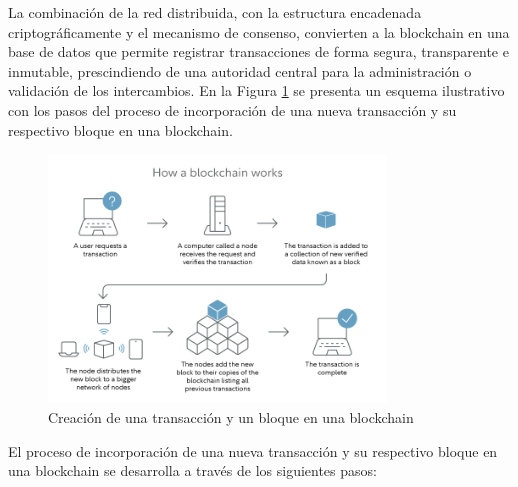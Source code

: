 La combinación de la red distribuida, con la estructura encadenada criptográficamente y el mecanismo de consenso, convierten a la blockchain en una base de datos que permite registrar transacciones de forma segura, transparente e inmutable, prescindiendo de una autoridad central para la administración o validación de los intercambios. En la Figura \ref{fig:blockchain-working} se presenta un esquema ilustrativo con los pasos del proceso de incorporación de una nueva transacción y su respectivo bloque en una blockchain. 

\begin{figure}[!htpb]
    \centering
    \includegraphics[width=0.8\textwidth]{Figures/block-creation.png}
    \caption{Creación de una transacción y un bloque en una blockchain}
    \label{fig:blockchain-working}
\end{figure}

El proceso de incorporación de una nueva transacción y su respectivo bloque en una blockchain se desarrolla a través de los siguientes pasos:

